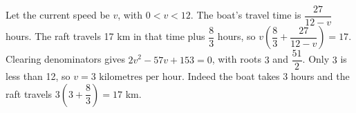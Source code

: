 Let the current speed be $v$, with $0<v<12$. The boat's travel time is $\dfrac{27}{12-v}$ hours. The raft travels 17 km in that time plus $\dfrac{8}{3}$ hours, so $v(\dfrac{8}{3}+\dfrac{27}{12-v})=17$. Clearing denominators gives $2v^2-57v+153=0$, with roots $3$ and $\dfrac{51}{2}$. Only $3$ is less than 12, so $\boxed{v=3\text{ kilometres per hour}}$. Indeed the boat takes 3 hours and the raft travels $3(3+\dfrac{8}{3})=17$ km.
